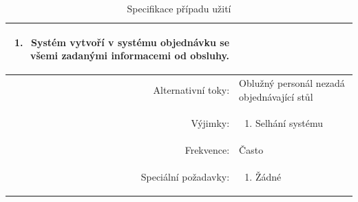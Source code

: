 \documentclass[a4paper,10pt]{article}
\begin{document}
\begin{table}[ht!]
{\begin{tabular}{| r | p{12cm} |}
\begin{minipage}[t]{0.75\textwidth}
\begin{enumerate}[nosep,after=\strut]
            \item Systém vytvoří v systému objednávku se všemi zadanými informacemi od obsluhy.
    	\end{enumerate}
  	\end{minipage} \\
    \hline 
    Alternativní toky: & Oblužný personál nezadá objednávající stůl  \\
    \hline
    Výjimky: & 
    \begin{minipage}[t]{0.75\textwidth}
    	\begin{enumerate}[nosep,after=\strut] 
            \item Selhání systému
    	\end{enumerate}
  	\end{minipage} \\
    \hline
    Frekvence: & Často \\
    \hline
    Speciální požadavky: & 
    \begin{minipage}[t]{0.75\textwidth}
    	\begin{enumerate}[nosep,after=\strut]
    		\item Žádné
    	\end{enumerate}
  	\end{minipage} \\
    \hline

\end{tabular}}
\caption{Specifikace případu užití }
\label{table:1}
\end{table}
\end{document}
